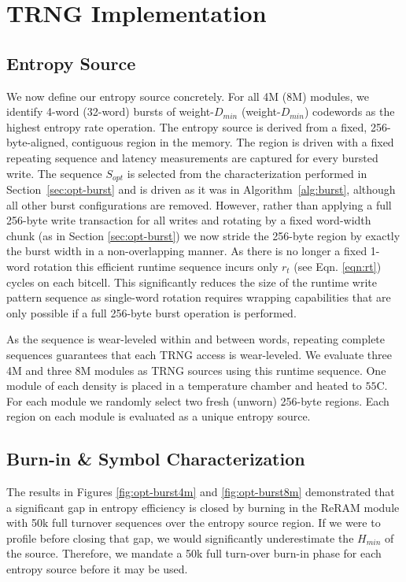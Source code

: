\section{TRNG Implementation}



\subsection{Entropy Source}
We now define our entropy source concretely. For all 4M (8M) modules, we
identify 4-word (32-word) bursts of weight-$D_{min}$ (weight-$D_{min}$)
codewords as the highest entropy rate operation. The entropy source is
derived from a fixed, 256-byte-aligned, contiguous region in the memory.
The region is driven with a fixed repeating sequence and latency
measurements are captured for every bursted write. The sequence
$S_{opt}$ is selected from the characterization performed in
Section~\ref{sec:opt-burst} and is driven as it was in
Algorithm~\ref{alg:burst}, although all other burst configurations are
removed. However, rather than applying a full 256-byte write transaction
for all writes and rotating by a fixed word-width chunk (as in Section
\ref{sec:opt-burst}) we now stride the 256-byte region by exactly the
burst width in a non-overlapping manner. As there is no longer a fixed
1-word rotation this efficient runtime sequence incurs only $r_t$ (see
Eqn. \ref{eqn:rt}) cycles on each bitcell. This significantly reduces
the size of the runtime write pattern sequence as single-word rotation
requires wrapping capabilities that are only possible if a full 256-byte
burst operation is performed.

As the sequence is wear-leveled within and between words, repeating
complete sequences guarantees that each TRNG access is wear-leveled. We
evaluate three 4M and three 8M modules as TRNG sources using this
runtime sequence. One module of each density is placed in a temperature
chamber and heated to $55$\textdegree C. For each module we randomly
select two fresh (unworn) 256-byte regions. Each region on each module
is evaluated as a unique entropy source.

\subsection{Burn-in \& Symbol Characterization}
The results in Figures \ref{fig:opt-burst4m} and \ref{fig:opt-burst8m}
demonstrated that a significant gap in entropy efficiency is closed by
burning in the ReRAM module with 50k full turnover sequences over the
entropy source region. If we were to profile before closing that gap, we
would significantly underestimate the $H_{min}$ of the source.
Therefore, we mandate a 50k full turn-over burn-in phase for each
entropy source before it may be used.

